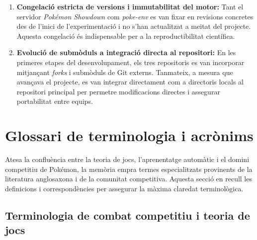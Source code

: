 \begin{enumerate}
    \item \textbf{Congelació estricta de versions i immutabilitat del motor:}
          Tant el servidor \textit{Pokémon Showdown} com \textit{poke-env} es van fixar en revisions concretes des de l'inici de l'experimentació i no s'han actualitzat a meitat del projecte. Aquesta congelació és indispensable per a la reproductibilitat científica.

    \item \textbf{Evolució de submòduls a integració directa al repositori:}
          En les primeres etapes del desenvolupament, els tres repositoris es van incorporar mitjançant \textit{forks} i submòduls de Git externs. Tanmateix, a mesura que avançava el projecte, es van integrar directament com a directoris locals al repositori principal per permetre modificacions directes i assegurar portabilitat entre equips.
\end{enumerate}

\section{Glossari de terminologia i acrònims}
\label{sec:app_glossari}

Atesa la confluència entre la teoria de jocs, l'aprenentatge automàtic i el domini competitiu de Pokémon, la memòria empra termes especialitzats provinents de la literatura anglosaxona i de la comunitat competitiva. Aquesta secció en recull les definicions i correspondències per assegurar la màxima claredat terminològica.

\subsection{Terminologia de combat competitiu i teoria de jocs}

